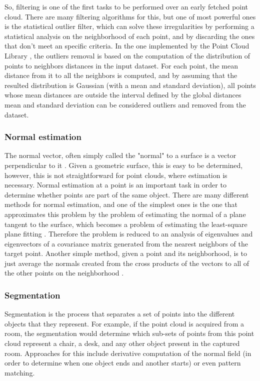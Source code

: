 \documentclass[msc, a4paper, classic, en]{ufbathesis}
\begin{document}
So, filtering is one of the first tasks to be performed over an early fetched point cloud. There are many filtering algorithms for this, but one of most powerful ones is the statistical outlier filter, which can solve these irregularities by performing a statistical analysis on the neighborhood of each point, and by discarding the ones that don't meet an specific criteria. In the one implemented by the Point Cloud Library \cite{pclstatout}, the outliers removal is based on the computation of the distribution of points to neighbors distances in the input dataset. For each point, the mean distance from it to all the neighbors is computed, and by assuming that the resulted distribution is Gaussian (with a mean and standard deviation), all points whose mean distances are outside the interval defined by the global distances mean and standard deviation can be considered outliers and removed from the dataset.

\subsubsection{Normal estimation}

The normal vector, often simply called the "normal" to a surface is a vector perpendicular to it \cite{normalwolf}. Given a geometric surface, this is easy to be determined, however, this is not straightforward for point clouds, where estimation is necessary. Normal estimation at a point is an important task in order to determine whether points are part of the same object. There are many different methods for normal estimation, and one of the simplest ones is the one that approximates this problem by the problem of estimating the normal of a plane tangent to the surface, which becomes a problem of estimating the least-square plane fitting \cite{pclnormal}. Therefore the problem is reduced to an analysis of eigenvalues and eigenvectors of a covariance matrix generated from the nearest neighbors of the target point. Another simple method, given a point and its neighborhood, is to just average the normals created from the cross products of the vectors to all of the other points on the neighborhood \cite{price2012}.

\subsubsection{Segmentation}

Segmentation is the process that separates a set of points into the different objects that they represent. For example, if the point cloud is acquired from a room, the segmentation would determine which sub-sets of points from this point cloud represent a chair, a desk, and any other object present in the captured room. Approaches for this include derivative computation of the normal field (in order to determine when one object ends and another starts) or even pattern matching.
\end{document}
